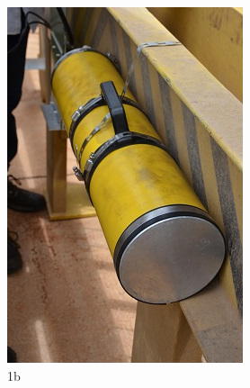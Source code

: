 \begin{figure}[h!]
  \centering
  \includegraphics[width=1\linewidth]{Fotos/Novembro2014/3.jpg}
  \caption{1b}
  \label{nov20132}
\end{figure}

